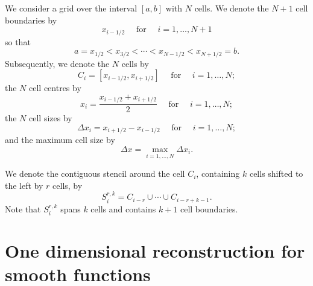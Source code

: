 \documentclass{article}
\newcommand{\for}[0]{\quad \text{ for } \quad}
\newcommand{\xli}[0]{x_{i-1/2}}
\newcommand{\xri}[0]{x_{i+1/2}}
\numberwithin{equation}{section}
\begin{document}
We consider a grid over the interval $[a,b]$ with $N$ cells.  We
denote the $N+1$ cell boundaries by
\begin{equation}
  x_{i-1/2} \for i = 1,\ldots,N+1
\end{equation}
so that
\begin{equation}
  a = x_{1/2} < x_{3/2} < \cdots < x_{N-1/2} < x_{N+1/2} = b.
\end{equation}
Subsequently, we denote the $N$ cells by
\begin{equation}
  C_i = [\xli, \xri] \for i=1,\ldots,N;
\end{equation}
the $N$ cell centres by
\begin{equation}
  x_i = \frac{\xli + \xri}{2} \for i=1,\ldots,N;
\end{equation}
the $N$ cell sizes by
\begin{equation}
  \Delta x_i = \xri - \xli \for i=1,\ldots,N;
\end{equation}
and the maximum cell size by
\begin{equation}
  \Delta x = \max_{i=1,\ldots,N} \Delta x_i.
\end{equation}

We denote the contiguous stencil around the cell $C_i$, containing $k$
cells shifted to the left by $r$ cells, by
\begin{equation}
  S_i^{r,k} = C_{i-r} \cup \cdots \cup C_{i-r+k-1}.
\end{equation}
Note that $S_i^{r,k}$ spans $k$ cells and contains $k+1$ cell
boundaries.

\newpage
\section{One dimensional reconstruction for smooth functions}
\label{sec:reconstruction}
\end{document}

